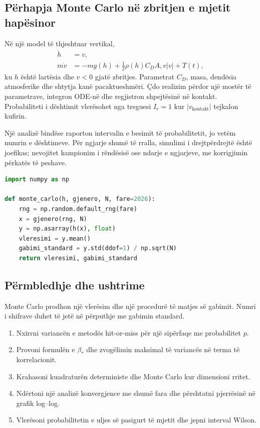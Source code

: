 \documentclass[11pt,oneside,openany]{book}
\begin{document}
\subsection{Përhapja Monte Carlo në zbritjen e mjetit hapësinor}
Në një model të thjeshtuar vertikal,
\begin{align}
 \dot h&=v,\\
 m\dot v&=-mg(h)+\tfrac12\rho(h)C_DA,v|v|+T(t),
\end{align}
ku $h$ është lartësia dhe $v<0$ gjatë zbritjes. Parametrat $C_D$, masa, dendësia atmosferike dhe shtytja kanë pacaktueshmëri. Çdo realizim përdor një mostër të parametrave, integron ODE-në dhe regjistron shpejtësinë në kontakt. Probabiliteti i dështimit vlerësohet nga treguesi $I_r=1$ kur $|v_{\mathrm{kontakt}}|$ tejkalon kufirin.

Një analizë bindëse raporton intervalin e besimit të probabilitetit, jo vetëm numrin e dështimeve. Për ngjarje shumë të rralla, simulimi i drejtpërdrejtë është joefikas; nevojitet kampionim i rëndësisë ose ndarje e ngjarjeve, me korrigjimin përkatës të peshave.

\begin{lstlisting}[language=Python,caption={Vlerësues Monte Carlo me gabim standard.}]
import numpy as np

def monte_carlo(h, gjenero, N, fare=2026):
    rng = np.random.default_rng(fare)
    x = gjenero(rng, N)
    y = np.asarray(h(x), float)
    vleresimi = y.mean()
    gabimi_standard = y.std(ddof=1) / np.sqrt(N)
    return vleresimi, gabimi_standard
\end{lstlisting}

\subsection{Përmbledhje dhe ushtrime}
Monte Carlo prodhon një vlerësim dhe një procedurë të matjes së gabimit. Numri i shifrave duhet të jetë në përputhje me gabimin standard.
\begin{enumerate}
\item Nxirrni variancën e metodës hit-or-miss për një sipërfaqe me probabilitet $p$.
\item Provoni formulën e $\beta_*$ dhe zvogëlimin maksimal të variancës në terma të korrelacionit.
\item Krahasoni kuadraturën deterministe dhe Monte Carlo kur dimensioni rritet.
\item Ndërtoni një analizë konvergjence me shumë fara dhe përshtatni pjerrësinë në grafik log--log.
\item Vlerësoni probabilitetin e uljes së pasigurt të mjetit dhe jepni interval Wilson.
\end{enumerate}
\end{document}
